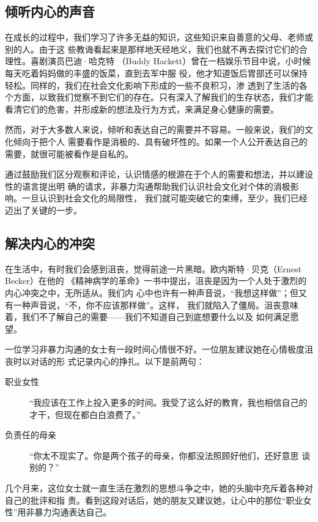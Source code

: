 \documentclass{ctexart}
\begin{document}
\subsection{倾听内心的声音}

在成长的过程中，我们学习了许多无益的知识，这些知识来自善意的父母、老师或别的人。由于这
些教诲看起来是那样地天经地义，我们也就不再去探讨它们的合理性。喜剧演员巴迪·哈克特
（Buddy Hackett）曾在一档娱乐节目中说，小时候每天吃着妈妈做的丰盛的饭菜，直到去军中服
役，他才知道饭后胃部还可以保持轻松。同样的，我们在社会文化影响下形成的一些不良积习，渗
透到了生活的各个方面，以致我们觉察不到它们的存在。只有深入了解我们的生存状态，我们才能
看清它们的危害，并形成新的想法及行为方式，来满足身心健康的需要。

然而，对于大多数人来说，倾听和表达自己的需要并不容易。一般来说，我们的文化倾向于把个人
需要看作是消极的、具有破坏性的。如果一个人公开表达自己的需要，就很可能被看作是自私的。

通过鼓励我们区分观察和评论，认识情感的根源在于个人的需要和想法，并以建设性的语言提出明
确的请求，非暴力沟通帮助我们认识社会文化对个体的消极影响。一旦认识到社会文化的局限性，
我们就可能突破它的束缚，至少，我们已经迈出了关键的一步。


\subsection{解决内心的冲突}

在生活中，有时我们会感到沮丧，觉得前途一片黑暗。欧内斯特·贝克（Ernest Becker）在他的
《精神病学的革命》一书中提出，沮丧是因为一个人处于激烈的内心冲突之中，无所适从。我们内
心中也许有一种声音说，``我想这样做''；但又有一种声音说，``不，你不应该那样做''。这样，
我们就陷入了僵局。沮丧意味着，我们不了解自己的需要------我们不知道自己到底想要什么以及
如何满足愿望。

一位学习非暴力沟通的女士有一段时间心情很不好。一位朋友建议她在心情极度沮丧时以对话的形
式记录内心的挣扎。以下是前两句：

\begin{description}
	\item[职业女性] ``我应该在工作上投入更多的时间。我受了这么好的教育，我也相信自己的
		才干，但现在都白白浪费了。''
	\item[负责任的母亲] ``你太不现实了。你是两个孩子的母亲，你都没法照顾好他们，还好意思
		谈别的？''
\end{description}

几个月来，这位女士就一直生活在激烈的思想斗争之中，她的头脑中充斥着各种对自己的批评和指
责。看到这段对话后，她的朋友又建议她，让心中的那位``职业女性''用非暴力沟通表达自己。
\end{document}
